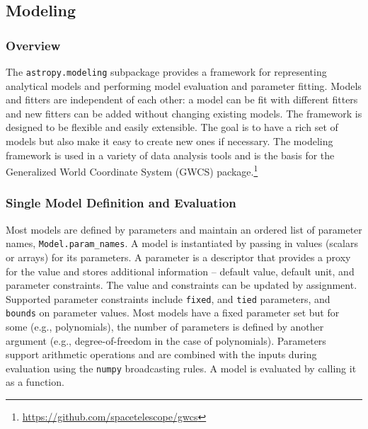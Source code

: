 \documentclass[modern]{aastex61}
\newcommand{\package}[1]{\texttt{#1}\xspace}
\newcommand{\inlinecomment}[2]{\todo[inline]{#1: #2}\xspace}
\begin{document}
\subsection{Modeling}
\label{sec:modeling}
\subsubsection{Overview}
The \package{astropy.modeling} subpackage provides a framework for representing
analytical models and performing model evaluation and parameter fitting. Models and
fitters are independent of each other: a model can be fit with different
fitters and new fitters can be added without changing existing models. The
framework is designed to be flexible and easily extensible. The goal is to have
a rich set of models but also make it easy to create new ones if necessary. The
modeling framework is used in a variety of data analysis tools and is the basis
for the Generalized World Coordinate System (GWCS)
package.\footnote{\url{https://github.com/spacetelescope/gwcs}}


\subsubsection{Single Model Definition and Evaluation}


Most models are defined by parameters and maintain an ordered list of parameter names, \texttt{Model.param\_names}. A model is instantiated by passing in values (scalars or arrays) for its parameters. A parameter is a descriptor that provides a proxy for the value and stores additional information -- default value, default unit, and parameter constraints. The value and constraints can be updated by assignment. Supported parameter constraints include \texttt{fixed}, and \texttt{tied} parameters, and \texttt{bounds} on parameter values. Most models have a fixed parameter set but for some (e.g., polynomials), the number of parameters is defined by another argument (e.g., degree-of-freedom in the case of polynomials). Parameters support arithmetic operations and are combined with the inputs during evaluation using the \package{numpy} broadcasting rules. A model is evaluated by calling it as a function.
\end{document}
